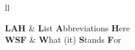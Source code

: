 \documentclass[
11pt, %
english, %
singlespacing, %
headsepline, %
]{MastersDoctoralThesis} %
\begin{document}

\tableofcontents %

\listoffigures %

\listoftables %


\begin{abbreviations}{ll} %

\textbf{LAH} & \textbf{L}ist \textbf{A}bbreviations \textbf{H}ere\\
\textbf{WSF} & \textbf{W}hat (it) \textbf{S}tands \textbf{F}or\\

\end{abbreviations}


\mainmatter %

\pagestyle{thesis} %



 

 

 


\appendix %



%
%


\printbibliography[heading=bibintoc]

\end{document}
